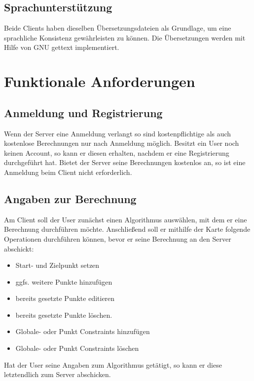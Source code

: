\documentclass[a4paper,10pt,titlepage]{article}
\begin{document}
\subsection{Sprachunterstützung}
Beide Clients haben dieselben Übersetzungsdateien als Grundlage, um eine sprachliche Konsistenz gewährleisten zu können.
Die Übersetzungen werden mit Hilfe von GNU gettext implementiert.

\clearpage
\section{Funktionale Anforderungen}

\subsection{Anmeldung und Registrierung}
Wenn der Server eine Anmeldung verlangt so sind kostenpflichtige als auch kostenlose Berechnungen nur nach Anmeldung möglich. 
Besitzt ein User noch keinen Account, so kann er diesen erhalten, nachdem er eine Registrierung durchgeführt hat.
Bietet der Server seine Berechnungen kostenlos an, so ist eine Anmeldung beim Client nicht erforderlich.

\subsection{Angaben zur Berechnung}
Am Client soll der User zunächst einen Algorithmus auswählen, mit dem er eine Berechnung durchführen möchte.
Anschließend soll er mithilfe der Karte folgende Operationen durchführen können, bevor er seine Berechnung an den Server abschickt:
\begin{itemize}
 \item Start- und Zielpunkt setzen
 \item ggfs. weitere Punkte hinzufügen
 \item bereits gesetzte Punkte editieren
 \item bereits gesetzte Punkte löschen.
 \item Globale- oder Punkt Constraints hinzufügen
 \item Globale- oder Punkt Constraints löschen
\end{itemize}
Hat der User seine Angaben zum Algorithmus getätigt, so kann er diese letztendlich zum Server abschicken.
\end{document}
